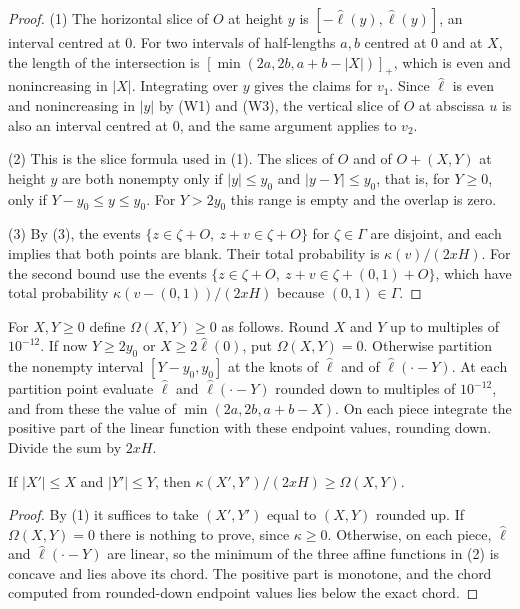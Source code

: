 \documentclass[11pt,colorlinks]{charlie}
\newcommand{\pos}[1]{\left[#1\right]_+}
\begin{document}
\begin{proof}
(1) The horizontal slice of $O$ at height $y$ is $[-\hat\ell(y),\hat\ell(y)]$, an interval centred at $0$. For two intervals of half-lengths $a,b$ centred at $0$ and at $X$, the length of the intersection is $\pos{\min(2a,2b,a+b-|X|)}$, which is even and nonincreasing in $|X|$. Integrating over $y$ gives the claims for $v_1$. Since $\hat\ell$ is even and nonincreasing in $|y|$ by (W1) and (W3), the vertical slice of $O$ at abscissa $u$ is also an interval centred at $0$, and the same argument applies to $v_2$.

(2) This is the slice formula used in (1). The slices of $O$ and of $O+(X,Y)$ at height $y$ are both nonempty only if $|y|\le y_0$ and $|y-Y|\le y_0$, that is, for $Y\ge0$, only if $Y-y_0\le y\le y_0$. For $Y>2y_0$ this range is empty and the overlap is zero.

(3) By (3), the events $\{z\in\zeta+O,\ z+v\in\zeta+O\}$ for $\zeta\in\Gamma$ are disjoint, and each implies that both points are blank. Their total probability is $\kappa(v)/(2xH)$. For the second bound use the events $\{z\in\zeta+O,\ z+v\in\zeta+(0,1)+O\}$, which have total probability $\kappa(v-(0,1))/(2xH)$ because $(0,1)\in\Gamma$.
\end{proof}

\begin{definition}\label{def:Omega}
For $X,Y\ge0$ define $\Omega(X,Y)\ge0$ as follows. Round $X$ and $Y$ up to multiples of $10^{-12}$. If now $Y\ge2y_0$ or $X\ge2\hat\ell(0)$, put $\Omega(X,Y)=0$. Otherwise partition the nonempty interval $[Y-y_0,y_0]$ at the knots of $\hat\ell$ and of $\hat\ell(\cdot-Y)$. At each partition point evaluate $\hat\ell$ and $\hat\ell(\cdot-Y)$ rounded down to multiples of $10^{-12}$, and from these the value of $\min(2a,2b,a+b-X)$. On each piece integrate the positive part of the linear function with these endpoint values, rounding down. Divide the sum by $2xH$.
\end{definition}

\begin{lemma}\label{lem:Omega}
If $|X'|\le X$ and $|Y'|\le Y$, then $\kappa(X',Y')/(2xH)\ge\Omega(X,Y)$.
\end{lemma}

\begin{proof}
By (1) it suffices to take $(X',Y')$ equal to $(X,Y)$ rounded up. If $\Omega(X,Y)=0$ there is nothing to prove, since $\kappa\ge0$. Otherwise, on each piece, $\hat\ell$ and $\hat\ell(\cdot-Y)$ are linear, so the minimum of the three affine functions in (2) is concave and lies above its chord. The positive part is monotone, and the chord computed from rounded-down endpoint values lies below the exact chord.
\end{proof}
\end{document}
